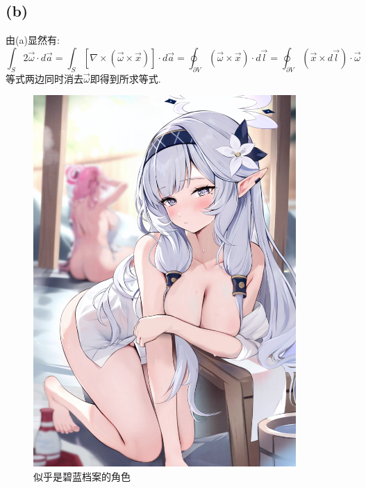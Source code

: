 \documentclass{ctexart}
\begin{document}
\subsection{(b)}
由(a)显然有:
\begin{equation}
    \int_{S}2\vec{\omega}\cdot d\vec{a}=\int_{S}[\nabla\times(\vec{\omega}\times\vec{x})]\cdot d\vec{a}=\oint_{\partial V}(\vec{\omega}\times\vec{x})\cdot d\vec{l}
    =\oint_{\partial V}(\vec{x}\times d\vec{l})\cdot\vec{\omega}
\end{equation}
等式两边同时消去$\vec{\omega}$即得到所求等式.
\begin{figure}[htbp]
\centering\includegraphics[width=10cm]{116161847_p0_master1200}
\caption{似乎是碧蓝档案的角色}
\end{figure}
\end{document}
